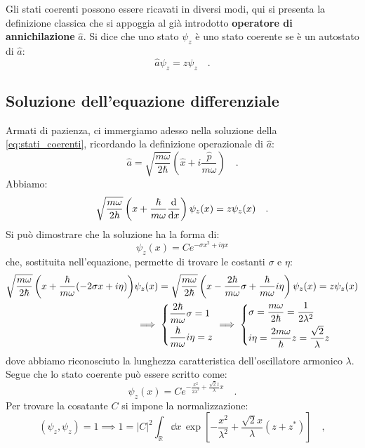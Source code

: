 Gli stati coerenti possono essere ricavati in diversi modi, qui si presenta la definizione classica che si appoggia al già introdotto \textbf{operatore di annichilazione} $\hat{a}$. Si dice che uno stato $\psi_z$ è uno stato coerente se è un autostato di $\hat{a}$:
\begin{equation}
    \hat{a} \psi_z = z\psi_z \quad.
    \label{eq:stati_coerenti}
\end{equation}

\subsection{Soluzione dell'equazione differenziale}
Armati di pazienza, ci immergiamo adesso nella soluzione della \eqref{eq:stati_coerenti}, ricordando la definizione operazionale di $\hat{a}$:
\[
    \hat{a} = \sqrt{\frac{m\omega}{2\hbar}} \left( \hat{x} + i\frac{\hat{p}}{m\omega} \right) \quad.
\]
Abbiamo:
\[
    \sqrt{\frac{m\omega}{2\hbar}} \left( x + \frac{\hbar}{m\omega} \dv{}{x}\right)\psi_z(x) = z\psi_z(x) \quad.
\]
Si può dimostrare che la soluzione ha la forma di:
\[
    \psi_z(x) = Ce^{-\sigma x^2 + i\eta x}
\] 
che, sostituita nell'equazione, permette di trovare le costanti $\sigma$ e $\eta$:
\[
    \begin{aligned}
        \sqrt{\frac{m\omega}{2\hbar}} \left( x + \frac{\hbar}{m\omega} (-2\sigma x + i\eta)\right)&\psi_z(x) = \sqrt{\frac{m\omega}{2\hbar}} \left( x - \frac{2\hbar}{m\omega}\sigma  + \frac{\hbar}{m\omega}i\eta \right)\psi_z(x) = z\psi_z(x)\\
        &\implies \begin{dcases}
            \frac{2\hbar}{m\omega}\sigma = 1 \\
            \frac{\hbar}{m\omega}i\eta = z 
        \end{dcases}
        \implies \begin{dcases}
        \sigma = \frac{m\omega}{2\hbar} = \frac{1}{2\lambda^2} \\
        i\eta = \frac{2m \omega}{\hbar}z = \frac{\sqrt{2}}{\lambda}z 
        \end{dcases}
    \end{aligned}
\] 
dove abbiamo riconosciuto la lunghezza caratteristica dell'oscillatore armonico $\lambda$. Segue che lo stato coerente può essere scritto come:
\[
    \psi_z(x) = Ce^{-\frac{x^2}{2\lambda^2} + \frac{\sqrt{2}z}{\lambda}x} \quad.
\]
Per trovare la cosatante $C$ si impone la normalizzazione:
\[
    (\psi_z, \psi_z) = 1 \implies 1 = |C|^2 \int_{\mathbb{R}} \dd{x} \, \exp\left[ -\frac{x^2}{\lambda^2} + \frac{\sqrt{2}x}{\lambda}(z+z^*) \right] \quad,
\]
